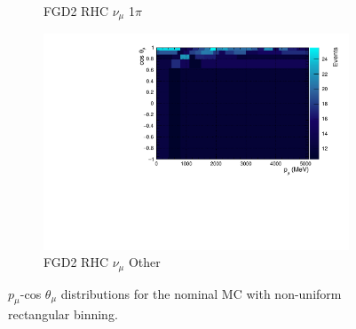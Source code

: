 \begin{figure}[!htbp]
\begin{subfigure}{.32\textwidth}
  \caption{FGD2 RHC $\nu_{\mu}$ 1$\pi$}
  \label{fig:th2polynomFGD2_NuMuBkg_CC1pi_in_AntiNu_Mode}
\end{subfigure}
\begin{subfigure}{.32\textwidth}
  \centering
  \includegraphics[width=0.95\linewidth]{figs/TH2PolyNom_MC_FGD2_NuMuBkg_CCOther_in_AntiNu_Mode}
  \caption{FGD2 RHC $\nu_{\mu}$ Other}
  \label{fig:th2polynomFGD2_NuMuBkg_CCOther_in_AntiNu_Mode}
\end{subfigure}
\caption{$p_{\mu}$-cos $\theta_{\mu}$ distributions for the nominal MC with non-uniform rectangular binning.}
\label{fig:th2polynombin}
\end{figure}


